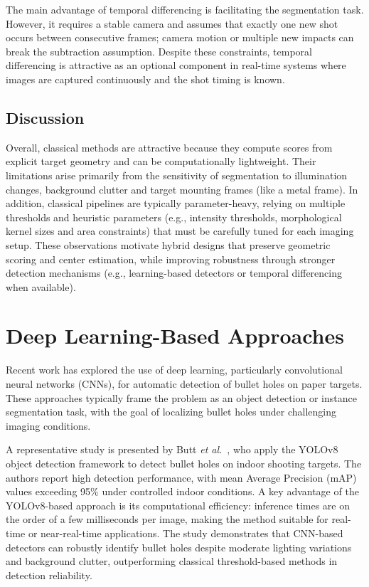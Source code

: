 The main advantage of temporal differencing is facilitating the segmentation task. 
However, it requires a stable camera and assumes that
exactly one new shot occurs between consecutive frames; camera motion or multiple new impacts can
break the subtraction assumption. Despite these constraints, temporal differencing is attractive as an
optional component in real-time systems where images are captured continuously and the shot timing is
known.

\subsection{Discussion}
Overall, classical methods are attractive because they compute scores from explicit target geometry
and can be computationally lightweight. Their limitations arise primarily from the sensitivity of
segmentation to illumination changes, background clutter and target mounting frames (like a metal frame).
In addition, classical pipelines are typically parameter-heavy, relying on multiple thresholds
and heuristic parameters (e.g., intensity thresholds, morphological kernel sizes and area constraints)
that must be carefully tuned for each imaging setup. These observations motivate hybrid designs
that preserve geometric scoring and center estimation, while improving robustness through stronger
detection mechanisms (e.g., learning-based detectors or temporal differencing when available).

\section{Deep Learning-Based Approaches}
\label{sec:deep_learning_methods}

Recent work has explored the use of deep learning, particularly convolutional neural networks
(CNNs), for automatic detection of bullet holes on paper targets. These approaches typically frame
the problem as an object detection or instance segmentation task, with the goal of localizing bullet
holes under challenging imaging conditions.

A representative study is presented by Butt \textit{et al.}~\cite{butt2024_bulletholes_yolov8}, who apply the
YOLOv8 object detection framework to detect bullet holes on indoor shooting targets. The authors
report high detection performance, with mean Average Precision (mAP) values exceeding 95\% under
controlled indoor conditions. A key advantage of the YOLOv8-based approach is its computational
efficiency: inference times are on the order of a few milliseconds per
image, making the method suitable for real-time or near-real-time applications. The study
demonstrates that CNN-based detectors can robustly identify bullet holes despite moderate lighting
variations and background clutter, outperforming classical threshold-based methods in detection
reliability.

